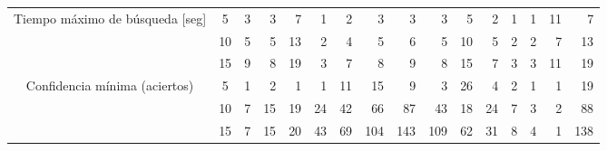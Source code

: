 \begin{sidewaystable}
\begin{tabular}{@{}ccc|rrrrrrrrrrrrrr@{}}
\midrule
\multicolumn{2}{c}{\multirow{3}{*}{Tiempo máximo de búsqueda {[}seg{]}}}     & 5                    & 3                      & 3                      & 7                      & 1                      & 2                      & 3                      & 3                      & 3                      & 5                      & 2                      & 1                      & 1                      & 11                     & 7                      \\
\multicolumn{2}{c}{}                                               & 10                   & 5                      & 5                      & 13                     & 2                      & 4                      & 5                      & 6                      & 5                      & 10                     & 5                      & 2                      & 2                      & 7                      & 13                     \\
\multicolumn{2}{c}{}                                               & 15                   & 9                      & 8                      & 19                     & 3                      & 7                      & 8                      & 9                      & 8                      & 15                     & 7                      & 3                      & 3                      & 11                     & 19                     \\
\midrule
\multicolumn{2}{c}{\multirow{3}{*}{Confidencia mínima (aciertos)}} & 5                    & 1                      & 2                      & 1                      & 1                      & 11                     & 15                     & 9                      & 3                      & 26                     & 4                      & 2                      & 1                      & 1                      & 19                     \\
\multicolumn{2}{c}{}                                               & 10                   & 7                      & 15                     & 19                     & 24                     & 42                     & 66                     & 87                     & 43                     & 18                     & 24                     & 7                      & 3                      & 2                      & 88                     \\
\multicolumn{2}{c}{}                                               & 15                   & 7                      & 15                     & 20                     & 43                     & 69                     & 104                    & 143                    & 109                    & 62                     & 31                     & 8                      & 4                      & 1                      & 138                    \\

\end{tabular}
\end{sidewaystable}
